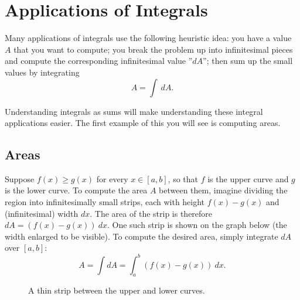 \section{Applications of Integrals}

Many applications of integrals use the following heuristic idea: you have a value $A$ that you want to compute; you break the problem up into infinitesimal pieces and compute the corresponding infinitesimal value ''$dA$''; then sum up the small values by integrating
$$A=\int\ dA.$$

Understanding integrals as sums will make understanding these integral applications easier.
The first example of this you will see is computing areas. 

\subsection{Areas}
Suppose $f(x)\geq g(x)$ for every $x\in[a,b]$, so that $f$ is the upper curve and $g$ is the lower curve. To compute the area $A$ between them, imagine dividing the region into infinitesimally small strips, each with height $f(x)-g(x)$ and (infinitesimal) width $dx$. The area of the strip is therefore $dA=(f(x)-g(x))\ dx$. One such strip is shown on the graph below (the width enlarged to be visible). To compute the desired area, simply integrate $dA$ over $[a,b]$:
$$A=\int dA = \int_a^b(f(x)-g(x))\ dx.$$

\begin{figure}[H]
\centering



\caption{A thin strip between the upper and lower curves.}
\end{figure}


